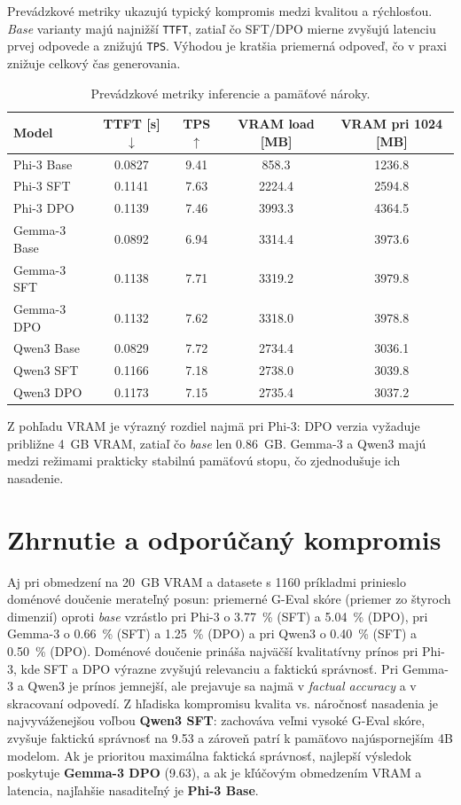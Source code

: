 Prevádzkové metriky ukazujú typický kompromis medzi kvalitou a rýchlosťou. \emph{Base} varianty majú najnižší \texttt{TTFT}, zatiaľ čo SFT/DPO mierne zvyšujú latenciu prvej odpovede a znižujú \texttt{TPS}. Výhodou je kratšia priemerná odpoveď, čo v praxi znižuje celkový čas generovania.

\begin{table}[h]
\centering
\small
\begin{tabular}{lcccc}
\hline
Model & TTFT [s] $\downarrow$ & TPS $\uparrow$ & VRAM load [MB] & VRAM pri 1024 [MB] \\
\hline
Phi-3 Base & 0.0827 & 9.41 & 858.3 & 1236.8 \\
Phi-3 SFT & 0.1141 & 7.63 & 2224.4 & 2594.8 \\
Phi-3 DPO & 0.1139 & 7.46 & 3993.3 & 4364.5 \\
Gemma-3 Base & 0.0892 & 6.94 & 3314.4 & 3973.6 \\
Gemma-3 SFT & 0.1138 & 7.71 & 3319.2 & 3979.8 \\
Gemma-3 DPO & 0.1132 & 7.62 & 3318.0 & 3978.8 \\
Qwen3 Base & 0.0829 & 7.72 & 2734.4 & 3036.1 \\
Qwen3 SFT & 0.1166 & 7.18 & 2738.0 & 3039.8 \\
Qwen3 DPO & 0.1173 & 7.15 & 2735.4 & 3037.2 \\
\hline
\end{tabular}
\caption{Prevádzkové metriky inferencie a pamäťové nároky.}
\label{tab:perf}
\end{table}

Z pohľadu VRAM je výrazný rozdiel najmä pri Phi-3: DPO verzia vyžaduje približne 4~GB VRAM, zatiaľ čo \emph{base} len 0.86~GB. Gemma-3 a Qwen3 majú medzi režimami prakticky stabilnú pamäťovú stopu, čo zjednodušuje ich nasadenie.

\section{Zhrnutie a odporúčaný kompromis}

Aj pri obmedzení na 20~GB VRAM a datasete s 1160 príkladmi prinieslo doménové doučenie merateľný posun: priemerné G-Eval skóre (priemer zo štyroch dimenzií) oproti \emph{base} vzrástlo pri Phi-3 o 3.77~\% (SFT) a 5.04~\% (DPO), pri Gemma-3 o 0.66~\% (SFT) a 1.25~\% (DPO) a pri Qwen3 o 0.40~\% (SFT) a 0.50~\% (DPO). Doménové doučenie prináša najväčší kvalitatívny prínos pri Phi-3, kde SFT a DPO výrazne zvyšujú relevanciu a faktickú správnosť. Pri Gemma-3 a Qwen3 je prínos jemnejší, ale prejavuje sa najmä v \emph{factual accuracy} a v skracovaní odpovedí. Z hľadiska kompromisu kvalita vs. náročnosť nasadenia je najvyváženejšou voľbou \textbf{Qwen3 SFT}: zachováva veľmi vysoké G-Eval skóre, zvyšuje faktickú správnosť na 9.53 a zároveň patrí k pamäťovo najúspornejším 4B modelom. Ak je prioritou maximálna faktická správnosť, najlepší výsledok poskytuje \textbf{Gemma-3 DPO} (9.63), a ak je kľúčovým obmedzením VRAM a latencia, najľahšie nasaditeľný je \textbf{Phi-3 Base}.

